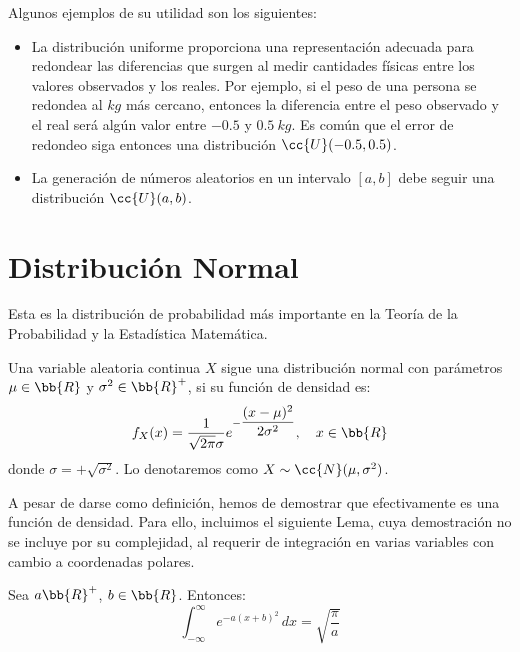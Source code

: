 Algunos ejemplos de su utilidad son los siguientes:
\begin{itemize}
    \item La distribución uniforme proporciona una representación adecuada para
    redondear las diferencias que surgen al medir cantidades físicas entre los
    valores observados y los reales.
    Por ejemplo, si el peso de una persona se redondea al $kg$ más cercano,
    entonces la diferencia entre el peso observado y el real será algún valor entre
    $-0.5$ y $0.5~kg$. Es común que el error de redondeo siga entonces una distribución
    $\cc{U}(-0.5,0.5)$.
    
    \item La generación de números aleatorios en un intervalo $[a,b]$ debe seguir una distribución
    $\cc{U}(a,b)$.
\end{itemize}


\section{Distribución Normal}

Esta es la distribución de probabilidad más importante en la Teoría de la Probabilidad y la Estadística Matemática.

\begin{definicion}
    Una variable aleatoria continua $X$ sigue una distribución normal con parámetros $\mu\in \bb{R}$ y $\sigma^2 \in \bb{R}^+$, si su función de densidad es:
    \begin{equation*}
        f_X(x) = \dfrac{1}{\sqrt{2\pi}\sigma} e^{-\dfrac{(x-\mu)^2}{2\sigma^2}}, \quad x\in \bb{R}
    \end{equation*}
    donde $\sigma=+\sqrt{\sigma^2}$.
    Lo denotaremos como $X\sim \cc{N}(\mu,\sigma^2)$.
\end{definicion}

A pesar de darse como definición, hemos de demostrar que efectivamente es una función de densidad.
Para ello, incluimos el siguiente Lema, cuya demostración no se incluye por su complejidad,
al requerir de integración en varias variables con cambio a coordenadas polares.
\begin{lema}
    Sea $a\bb{R}^+$, $b\in \bb{R}$. Entonces:
    \begin{equation*}
        \int_{-\infty}^{\infty} e^{-a(x+b)^2} \, dx = \sqrt{\dfrac{\pi}{a}}
    \end{equation*}
\end{lema}

